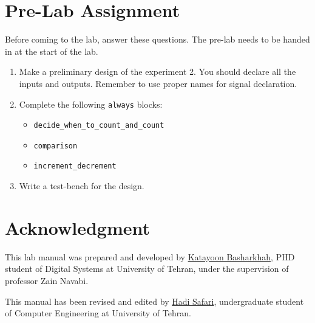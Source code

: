 \documentclass[12pt, logo=tehranDLDL/ut]{tehranDLDL}
\begin{document}
\designverification{}

\section*{Pre-Lab Assignment}
Before coming to the lab, answer these questions. The pre-lab needs to be handed in at the start of the lab.

\begin{enumerate}
    \item Make a preliminary design of the experiment 2. You should declare all the inputs and outputs. Remember to use proper names for signal declaration.
    \item Complete the following \lstinline{always} blocks:
    \begin{itemize}
        \item \lstinline{decide_when_to_count_and_count}
        \item \lstinline{comparison}
        \item \lstinline{increment_decrement}
    \end{itemize}
    \item Write a test-bench for the design.
\end{enumerate}

\section*{Acknowledgment}

This lab manual was prepared and developed by \href{mailto:ktbasharkhah@gmail.com?subject=[DLDLab]\%20}{Katayoon Basharkhah}, PHD student of Digital Systems at University of Tehran, under the supervision of professor Zain Navabi.

This manual has been revised and edited by \href{mailto:hadi.safari@ut.ac.ir?subject=[DLDLab]\%20}{Hadi Safari}, undergraduate student of Computer Engineering at University of Tehran.
\end{document}

